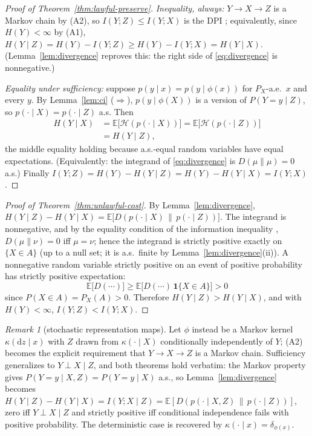 \documentclass[twocolumn,10pt]{article}
\theoremstyle{definition}
\theoremstyle{remark}
\newtheorem{remark}[theorem]{Remark}
\newcommand{\E}{\mathbb{E}}
\newcommand{\cH}{\mathcal{H}}
\begin{document}
\begin{proof}[Proof of Theorem~\ref{thm:lawful-preserve}]
\emph{Inequality, always:} $Y \to X \to Z$ is a Markov chain by (A2), so
$I(Y; Z) \le I(Y; X)$ is the DPI \cite[Thm.~2.8.1]{coverthomas};
equivalently, since $H(Y) < \infty$ by (A1),
$H(Y \mid Z) = H(Y) - I(Y; Z) \ge H(Y) - I(Y; X) = H(Y \mid X)$.
(Lemma~\ref{lem:divergence} reproves this: the right side of
\eqref{eq:divergence} is nonnegative.)

\emph{Equality under sufficiency:} suppose
$p(y \mid x) = p(y \mid \phi(x))$ for $P_X$-a.e.\ $x$ and every $y$. By
Lemma~\ref{lem:ci} ($\Rightarrow$), $p(y \mid \phi(X))$ is a version of
$P(Y = y \mid Z)$, so $p(\cdot \mid X) = p(\cdot \mid Z)$ a.s. Then
\begin{align*}
H(Y \mid X)
&= \E\big[\cH(p(\cdot \mid X))\big]
= \E\big[\cH(p(\cdot \mid Z))\big] \\
&= H(Y \mid Z),
\end{align*}
the middle equality holding because a.s.-equal random variables have equal
expectations. (Equivalently: the integrand of \eqref{eq:divergence} is
$D(\mu \| \mu) = 0$ a.s.) Finally
$I(Y; Z) = H(Y) - H(Y \mid Z) = H(Y) - H(Y \mid X) = I(Y; X)$.
\end{proof}

\begin{proof}[Proof of Theorem~\ref{thm:unlawful-cost}]
By Lemma~\ref{lem:divergence},
$H(Y \mid Z) - H(Y \mid X) = \E\big[D(p(\cdot \mid X) \,\|\, p(\cdot \mid
Z))\big]$. The integrand is nonnegative, and by the equality condition of
the information inequality \cite[Thm.~2.6.3]{coverthomas},
$D(\mu \| \nu) = 0$ iff $\mu = \nu$; hence the integrand is strictly
positive exactly on $\{X \in A\}$ (up to a null set; it is a.s.\ finite by
Lemma~\ref{lem:divergence}(ii)). A nonnegative random variable strictly
positive on an event of positive probability has strictly positive
expectation:
\[
\E\big[D(\cdots)\big]
\ge \E\big[D(\cdots)\,\mathbf 1\{X \in A\}\big] > 0
\]
since $P(X \in A) = P_X(A) > 0$. Therefore $H(Y \mid Z) > H(Y \mid X)$,
and with $H(Y) < \infty$, $I(Y; Z) < I(Y; X)$.
\end{proof}

\begin{remark}[stochastic representation maps]
\label{rem:stochastic}
Let $\phi$ instead be a Markov kernel $\kappa(\mathrm dz \mid x)$ with $Z$
drawn from $\kappa(\cdot \mid X)$ conditionally independently of $Y$; (A2)
becomes the explicit requirement that $Y \to X \to Z$ is a Markov chain.
Sufficiency generalizes to $Y \perp X \mid Z$, and both theorems hold
verbatim: the Markov property gives
$P(Y = y \mid X, Z) = P(Y = y \mid X)$ a.s., so
Lemma~\ref{lem:divergence} becomes
$H(Y \mid Z) - H(Y \mid X) = I(Y; X \mid Z)
= \E[D(p(\cdot \mid X, Z) \,\|\, p(\cdot \mid Z))]$,
zero iff $Y \perp X \mid Z$ and strictly positive iff conditional
independence fails with positive probability. The deterministic case is
recovered by $\kappa(\cdot \mid x) = \delta_{\phi(x)}$.
\end{remark}
\end{document}
